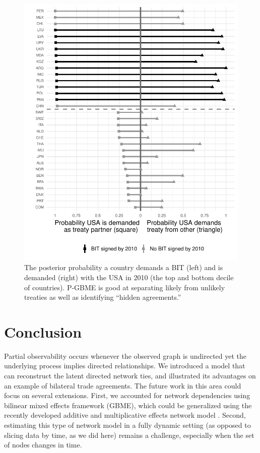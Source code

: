 \documentclass[a4paper, 12pt]{article}
\begin{document}
\begin{figure}[ht]
  \centering
\includegraphics[width=.7\textwidth]{figure2.pdf} 
\caption{The posterior probability a country demands a BIT (left) and is demanded (right) with the USA in 2010 (the top and bottom decile of countries).  P-GBME is good at separating likely from unlikely treaties as well as identifying ``hidden agreements.''} 
  \label{fig:predplotUSA}
\end{figure}
\FloatBarrier

\section{Conclusion}

Partial observability occurs whenever the observed graph is undirected yet the underlying process implies directed relationships. We introduced a model that can reconstruct the latent directed network ties, and illustrated its advantages on an example of bilateral trade agreements. The future work in this area could focus on several extensions. First, we accounted for network dependencies using bilinear mixed effects framework (GBME), which could be generalized using  the recently developed additive and multiplicative effects network model \citep{hoff:2015:arxiv,minhas:etal:2016:arxiv}. Second, estimating this type of network model in a fully dynamic setting (as opposed to slicing data by time, as we did here) remains a challenge, especially when the set of nodes changes in time.
\end{document}
